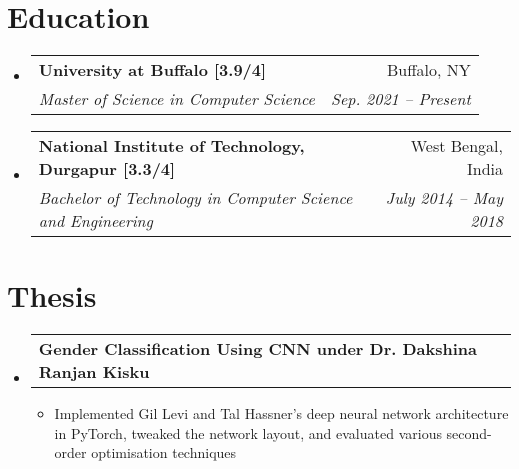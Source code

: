 \documentclass[letterpaper,10pt]{article}
\makeatletter
\newcommand{\resumeItemClean}[1]{
    \item\small{
        {#1 \vspace{-2pt}}
    }
}
\newcommand{\resumeSubheading}[4]{
  \vspace{-1pt}\item
    \begin{tabular*}{0.97\textwidth}[t]{l@{\extracolsep{\fill}}r}
      \textbf{#1} & #2 \\
      \textit{\small#3} & \textit{\small #4} \\
    \end{tabular*}\vspace{-5pt}
}
\newcommand{\projectheading}[3]{
    \vspace{-1pt}\item
        \begin{tabular*}{0.97\textwidth}{l@{\extracolsep{\fill}}r}
            \textbf{#1} & \textbf{#2} #3\\
    \end{tabular*}\vspace{-5pt}
}
\newcommand{\resumeSubHeadingListStart}{\begin{itemize}[leftmargin=*]}
\newcommand{\resumeSubHeadingListEnd}{\end{itemize}}
\newcommand{\resumeItemListStart}{\begin{itemize}}
\newcommand{\resumeItemListEnd}{\end{itemize}\vspace{-5pt}}
\makeatother
\begin{document}
\section{Education}
    \resumeSubHeadingListStart
        \resumeSubheading
          {University at Buffalo [3.9/4]}{Buffalo, NY}
          {Master of Science in Computer Science}{Sep. 2021 -- Present}
        \resumeSubheading
          {National Institute of Technology, Durgapur [3.3/4]}{West Bengal, India}
          {Bachelor of Technology in Computer Science and Engineering}{July 2014 -- May 2018}
    \resumeSubHeadingListEnd
    
\section{Thesis}
\resumeSubHeadingListStart
\projectheading{Gender Classification Using CNN under Dr. Dakshina Ranjan Kisku}{}{}{}
            \resumeItemListStart
                \resumeItemClean
                    {Implemented Gil Levi and Tal Hassner's deep neural network architecture in PyTorch, tweaked the network layout, and evaluated various second-order optimisation techniques}
            \resumeItemListEnd
  \resumeSubHeadingListEnd
    
\end{document}
